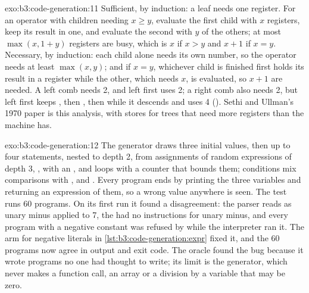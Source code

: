 \begin{solution}{exo:b3:code-generation:11}
Sufficient, by induction: a leaf needs one register. For an operator with children needing $x \ge y$, evaluate the first child with $x$ registers, keep its result in one, and evaluate the second with $y$ of the others; at most $\max(x, 1 + y)$ registers are busy, which is $x$ if $x > y$ and $x + 1$ if $x = y$. Necessary, by induction: each child alone needs its own number, so the operator needs at least $\max(x, y)$; and if $x = y$, whichever child is finished first holds its result in a register while the other, which needs $x$, is evaluated, so $x + 1$ are needed. A left comb  needs 2, and left first uses 2; a right comb  also needs 2, but left first keeps , then , then  while it descends and uses 4 (). Sethi and Ullman's 1970 paper is this analysis, with stores for trees that need more registers than the machine has. %
\end{solution}

\begin{solution}{exo:b3:code-generation:12}
The generator draws three initial values, then up to four statements, nested to depth 2, from assignments of random expressions of depth 3, ,  with an , and  loops with a counter that bounds them; conditions mix comparisons with \code{&&}, \code{||} and \code{!}. Every program ends by printing the three variables and returning an expression of them, so a wrong value anywhere is seen. The test  runs 60 programs. On its first run it found a disagreement: the parser reads  as unary minus applied to 7, the  had no instructions for unary minus, and every program with a negative constant was refused by  while the interpreter ran it. The arm for negative literals in \cref{lst:b3:code-generation:expr} fixed it, and the 60 programs now agree in output and exit code. The oracle found the bug because it wrote programs no one had thought to write; its limit is the generator, which never makes a function call, an array or a division by a variable that may be zero.
\end{solution}

